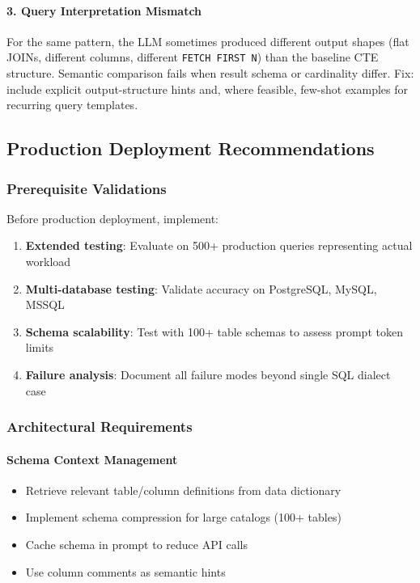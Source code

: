 \paragraph{3. Query Interpretation Mismatch}
For the same pattern, the LLM sometimes produced different output shapes (flat JOINs, different columns, different \texttt{FETCH FIRST N}) than the baseline CTE structure. Semantic comparison fails when result schema or cardinality differ. Fix: include explicit output-structure hints and, where feasible, few-shot examples for recurring query templates.

\subsection{Production Deployment Recommendations}

\subsubsection{Prerequisite Validations}

Before production deployment, implement:

\begin{enumerate}
    \item \textbf{Extended testing}: Evaluate on 500+ production queries representing actual workload
    \item \textbf{Multi-database testing}: Validate accuracy on PostgreSQL, MySQL, MSSQL
    \item \textbf{Schema scalability}: Test with 100+ table schemas to assess prompt token limits
    \item \textbf{Failure analysis}: Document all failure modes beyond single SQL dialect case
\end{enumerate}

\subsubsection{Architectural Requirements}

\paragraph{Schema Context Management}
\begin{itemize}
    \item Retrieve relevant table/column definitions from data dictionary
    \item Implement schema compression for large catalogs (100+ tables)
    \item Cache schema in prompt to reduce API calls
    \item Use column comments as semantic hints
\end{itemize}

